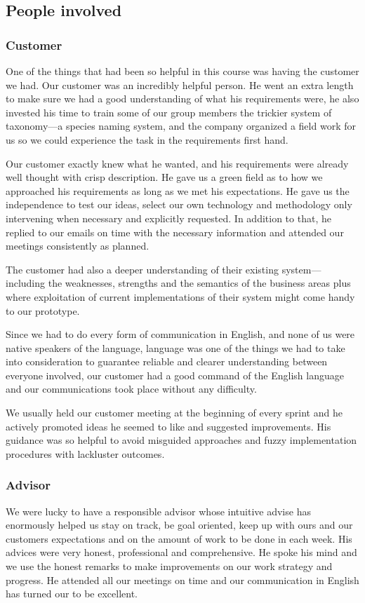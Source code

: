 \subsection{People involved}
	\subsubsection{Customer}
One of the things that had been so helpful in this course was having the customer we had. Our customer was an incredibly helpful person. He went an extra length to make sure we had a good understanding of what his requirements were, he also invested his time to train some of our group members the trickier system of taxonomy---a species naming system, and the company organized a field work for us so we could experience the task in the requirements first hand.

Our customer exactly knew what he wanted, and his requirements were already well thought with crisp description. He gave us a green field as to how we approached his requirements as long as we met his expectations. He gave us the independence to test our ideas, select our own technology and methodology only intervening when necessary and explicitly requested. In addition to that, he replied to our emails on time with the necessary information and attended our meetings consistently as planned.

The customer had also a deeper understanding of their existing system---including the weaknesses, strengths and the semantics of the business areas plus where exploitation of current implementations of their system might come handy to our prototype.

Since we had to do every form of communication in English, and none of us were native speakers of the language, language was one of the things we had to take into consideration to guarantee reliable and clearer understanding between everyone involved, our customer had a good command of the English language and our communications took place without any difficulty.

We usually held our customer meeting at the beginning of every sprint and he actively promoted ideas he seemed to like and suggested improvements.  His guidance was so helpful to avoid misguided approaches and fuzzy implementation procedures with lackluster outcomes.

	\subsubsection{Advisor}
We were lucky to have a responsible advisor whose intuitive advise has enormously helped us stay on track, be goal oriented, keep up with ours and our customers expectations and on the amount of work to be done in each week. His advices were very honest, professional and comprehensive. He spoke his mind and we use the honest remarks to make improvements on our work strategy and progress. He attended all our meetings on time and our communication in English has turned our to be excellent.

